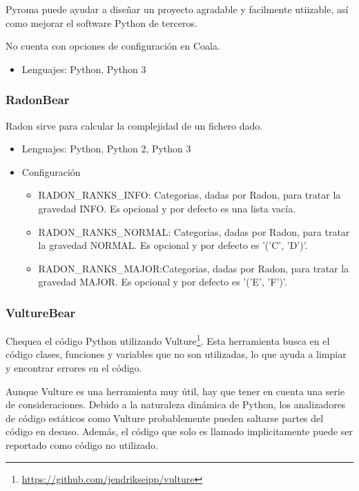 \documentclass[a4paper, 12pt]{book}
\begin{document}
Pyroma puede ayudar a diseñar un proyecto agradable y facilmente utiizable, así como mejorar el software Python de terceros.

No cuenta con opciones de configuración en Coala.

\begin{itemize}
  \item Lenguajes: Python, Python 3
\end{itemize}

\subsubsection{RadonBear}
\label{sec:seccion1.2.14}
Radon sirve para calcular la complejidad de un fichero dado.

\begin{itemize}
  \item Lenguajes: Python, Python 2, Python 3
  \item Configuración
    \begin{itemize}
          \item RADON\_RANKS\_INFO: Categorias, dadas por Radon, para tratar la gravedad INFO. Es opcional y por defecto es una lista vacía.
          \item RADON\_RANKS\_NORMAL: Categorias, dadas por Radon, para tratar la gravedad NORMAL. Es opcional y por defecto es '('C', 'D')'.
          \item RADON\_RANKS\_MAJOR:Categorias, dadas por Radon, para tratar la gravedad MAJOR. Es opcional y por defecto es '('E', 'F')'.
    \end{itemize}
\end{itemize}

\subsubsection{VultureBear}
\label{sec:seccion1.2.15}
Chequea el código Python utilizando Vulture\footnote{\url{https://github.com/jendrikseipp/vulture}}. Esta herramienta busca en el código clases, funciones y variables que no son utilizadas, lo que ayuda a limpiar y encontrar errores en el código.

Aunque Vulture es una herramienta muy útil, hay que tener en cuenta una serie de consideraciones. Debido a la naturaleza dinámica de Python, los analizadores de código estáticos como Vulture probablemente pueden saltarse partes del código en desuso. Además, el código que solo es llamado implicitamente puede ser reportado como código no utilizado.
\end{document}
